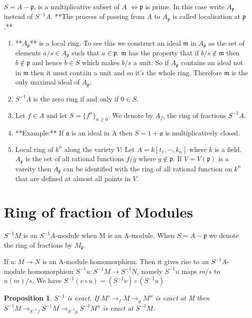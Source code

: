 \documentclass[]{report}
\newtheorem{prop}[theorem]{Proposition}
\begin{document}
$S = A - \mathfrak{p}$, is a multiplicative subset of $A$ $\Leftrightarrow \mathfrak{p}$ is prime. In this case write $A_\mathfrak{p}$ instead of $S^{-1}A$. **The process of passing from $A$ to $A_\mathfrak{p}$ is called localisation at $\mathfrak{p}$.**

\begin{enumerate}
    \item **$A_\mathfrak{p}$** is a local ring. To see this we construct an ideal $\mathfrak{m}$ in $A_\mathfrak{p}$ as the set of elements $a/s \in A_\mathfrak{p}$ such that $a\in \mathfrak{p}$. $\mathfrak{m}$ has the property that if $b/s\not \in \mathfrak{m}$ then $b\not \in \mathfrak{p}$ and hence $b\in S$ which makes $b/s$ a unit. So if $A_\mathfrak{p}$ contains an ideal not in $\mathfrak{m}$ then it must contain a unit and so it's the whole ring. Therefore $\mathfrak{m}$ is the only maximal ideal of $A_\mathfrak{p}$. 
    \item $S^{-1}A$ is the zero ring if and only if $0\in S$. 
    \item Let $f\in A$ and let $S = \{f^n\}_{n\geq 0}$. We denote by $A_f$, the ring of fractions $S^{-1}A$.
    \item **Example:** If $\mathfrak{a}$ is an ideal in A then $S = 1+\mathfrak{a}$ is multiplicatively closed. 
    \item Local ring of $k^n$ along the variety $V$: Let $A = k[t_1,\cdots,k_n]$ where $k$ is a field. $A_\mathfrak{p}$ is the set of all rational functions $f/g$ where $g\not \in \mathfrak{p}$. If $V = V(\mathfrak{p})$ is a vareity then $A_\mathfrak{p}$ can be identified with the ring of all rational function on $k^n$ that are defined at almost all points in $V$. 
\end{enumerate}

\section{Ring of fraction of Modules}

$S^{-1}M$ is an $S^{-1}A$-module when M is an A-module. When $S = A-\mathfrak{p}$ we denote the ring of fractions by $M_\mathfrak{p}$.

If $u: M\rightarrow N$ is an A-module homomorphism. Then it gives rise to an $S^{-1}A$-module homomorphism $S^{-1}u: S^{-1}M \rightarrow S^{-1}N$, namely $S^{-1}u$ maps $m/s$ to $u(m)/s$. We have $S^{-1}(v\circ u) = (S^{-1}v) \circ (S^{-1}u)$

\begin{prop}
    $S^{-1}$ is exact.  If $M'\rightarrow_f M \rightarrow_g M''$ is exact at M then $S^{-1}M \rightarrow_{S^{-1}f} S^{-1}M \rightarrow_{S^{-1}g} S^{-1}M''$ is exact at $S^{-1}M$. 
\end{prop}
\end{document}
